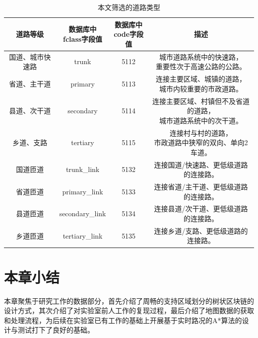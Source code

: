 \begin{table}[ht]
    \linespread{1.5}
    \centering
    \caption{本文筛选的道路类型}
    \label{mapData_pathpro}
    \begin{tabular}{cccc}
    \toprule
    道路等级 & \makecell{数据库中\\fclass字段值} & \makecell{数据库中\\code字段值} & 描述 \\
    \midrule
    国道、城市快速路 & trunk & 5112 & \makecell{城市道路系统中的快速路，\\重要性次于高速公路的公路。}\\
    省道、主干道 & primary & 5113 & \makecell{连接主要区域、城镇的道路，\\城市内较重要的市政道路。 }\\
    县道、次干道 & secondary & 5114 & \makecell{连接主要区域、村镇但不及省道的道路，\\城市道路系统中的次干道。} \\
    乡道、支路 & tertiary & 5115 & \makecell{连接村与村的道路，\\市政道路中狭窄的双向、单向2车道。}\\
    国道匝道 & trunk\_link & 5132 & 连接国道/快速路、更低级道路的连接路。\\
    省道匝道 & primary\_link & 5133 & 连接省道/主干道、更低级道路的连接路。\\
    县道匝道 & secondary\_link & 5134 & 连接县道/次干道、更低级道路的连接路。\\
    乡道匝道 & tertiary\_link & 5135 & 连接乡道/支路、更低级道路的连接路。\\
    \bottomrule
    \end{tabular}
\end{table}

\section{本章小结}

本章聚焦于研究工作的数据部分，首先介绍了周畅的支持区域划分的树状区块链的设计方式，其次介绍了对实验室前人工作的复现过程，最后介绍了地图数据的获取和处理流程，为后续在实验室已有工作的基础上开展基于实时路况的A*算法的设计与测试打下了良好的基础。